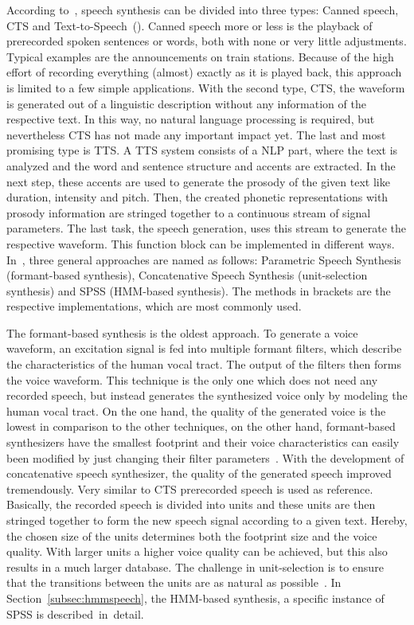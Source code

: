 According to~\cite{hinterleitner:quality}, speech synthesis can be divided into three types: Canned speech, \ac{CTS} and Text-to-Speech~(). Canned speech more or less is the playback of prerecorded spoken sentences or words, both with none or very little adjustments. Typical examples are the announcements on train stations. Because of the high effort of recording everything (almost) exactly as it is played back, this approach is limited to a few simple applications. With the second type, \ac{CTS}, the waveform is generated out of a linguistic description without any information of the respective text. In this way, no natural language processing is required, but nevertheless \ac{CTS} has not made any important impact yet. The last and most promising type is \ac{TTS}. A \ac{TTS} system consists of a \ac{NLP} part, where the text is analyzed and the word and sentence structure and accents are extracted. In the next step, these accents are used to generate the prosody of the given text like duration, intensity and pitch. Then, the created phonetic representations with prosody information are stringed together to a continuous stream of signal parameters. The last task, the speech generation, uses this stream to generate the respective waveform. This function block can be implemented in different ways. In~\cite{hinterleitner:quality}, three general approaches are named as follows: Parametric Speech Synthesis (formant-based synthesis), Concatenative Speech Synthesis (unit-selection synthesis) and \acf{SPSS} (\acf{HMM}-based synthesis). The methods in brackets are the respective implementations, which are most commonly used. 

The formant-based synthesis is the oldest approach. To generate a voice waveform, an excitation signal is fed into multiple formant filters, which describe the characteristics of the human vocal tract. The output of the filters then forms the voice waveform. This technique is the only one which does not need any recorded speech, but instead generates the synthesized voice only by modeling the human vocal tract. On the one hand, the quality of the generated voice is the lowest in comparison to the other techniques, on the other hand, formant-based synthesizers have the smallest footprint and their voice characteristics can easily been modified by just changing their filter parameters~\cite{hinterleitner:quality}.
With the development of concatenative speech synthesizer, the quality of the generated speech improved tremendously. Very similar to \ac{CTS} prerecorded speech is used as reference. Basically, the recorded speech is divided into units and these units are then stringed together to form the new speech signal according to a given text. Hereby, the chosen size of the units determines both the footprint size and the voice quality. With larger units a higher voice quality can be achieved, but this also results in a much larger database. The challenge in unit-selection is to ensure that the transitions between the units are as natural as possible~\cite{hinterleitner:quality}. In Section~\ref{subsec:hmmspeech}, the \ac{HMM}-based synthesis, a specific instance of \ac{SPSS} is described~in~detail.

